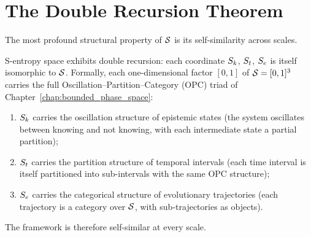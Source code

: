 \section{The Double Recursion Theorem}
\label{sec:double_recursion}

The most profound structural property of $\mathcal{S}$ is its self-similarity
across scales.

\begin{theorem}
\label{thm:double_recursion}
S-entropy space exhibits double recursion: each coordinate $S_k$, $S_t$, $S_e$
is itself isomorphic to $\mathcal{S}$. Formally, each one-dimensional factor
$[0,1]$ of $\mathcal{S} = [0,1]^3$ carries the full Oscillation--Partition--Category
(OPC) triad of Chapter~\ref{chap:bounded_phase_space}:
\begin{enumerate}[label=(\roman*)]
  \item $S_k$ carries the oscillation structure of epistemic states (the
        system oscillates between knowing and not knowing, with each intermediate
        state a partial partition);
  \item $S_t$ carries the partition structure of temporal intervals (each
        time interval is itself partitioned into sub-intervals with the same
        OPC structure);
  \item $S_e$ carries the categorical structure of evolutionary trajectories
        (each trajectory is a category over $\mathcal{S}$, with sub-trajectories
        as objects).
\end{enumerate}
The framework is therefore self-similar at every scale.
\end{theorem}

